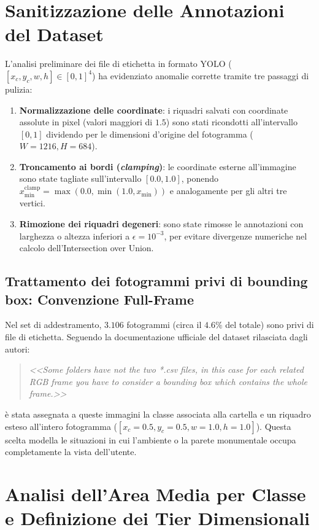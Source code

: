\section{Sanitizzazione delle Annotazioni del Dataset}
\label{sec:dataset_sanitizzazione}
L'analisi preliminare dei file di etichetta in formato YOLO ($[x_c, y_c, w, h] \in [0, 1]^4$) ha evidenziato anomalie corrette tramite tre passaggi di pulizia:
\begin{enumerate}
    \item \textbf{Normalizzazione delle coordinate}: i riquadri salvati con coordinate assolute in pixel (valori maggiori di $1.5$) sono stati ricondotti all'intervallo $[0, 1]$ dividendo per le dimensioni d'origine del fotogramma ($W=1216, H=684$).
    \item \textbf{Troncamento ai bordi (\textit{clamping})}: le coordinate esterne all'immagine sono state tagliate sull'intervallo $[0.0, 1.0]$, ponendo $x_{\min}^{\text{clamp}} = \max(0.0, \min(1.0, x_{\min}))$ e analogamente per gli altri tre vertici.
    \item \textbf{Rimozione dei riquadri degeneri}: sono state rimosse le annotazioni con larghezza o altezza inferiori a $\epsilon = 10^{-3}$, per evitare divergenze numeriche nel calcolo dell'Intersection over Union.
\end{enumerate}

\subsection{Trattamento dei fotogrammi privi di bounding box: Convenzione Full-Frame}
Nel set di addestramento, $3.106$ fotogrammi (circa il $4.6\%$ del totale) sono privi di file di etichetta. Seguendo la documentazione ufficiale del dataset rilasciata dagli autori:
\begin{quote}
    \textit{<<Some folders have not the two *.csv files, in this case for each related RGB frame you have to consider a bounding box which contains the whole frame.>>}
\end{quote}
è stata assegnata a queste immagini la classe associata alla cartella e un riquadro esteso all'intero fotogramma ($[x_c = 0.5, y_c = 0.5, w = 1.0, h = 1.0]$). Questa scelta modella le situazioni in cui l'ambiente o la parete monumentale occupa completamente la vista dell'utente.

\section{Analisi dell'Area Media per Classe e Definizione dei Tier Dimensionali}
\label{sec:dataset_tiers}

